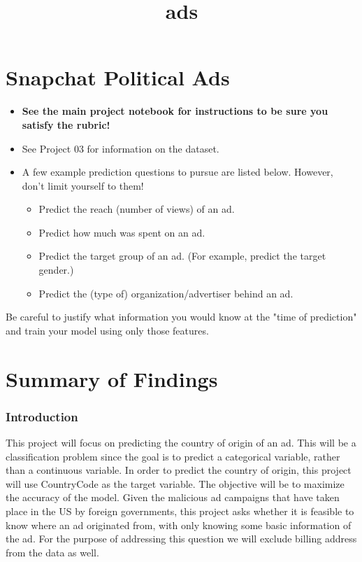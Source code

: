 \documentclass[11pt]{article}
\title{ads}
\providecommand{\tightlist}{%
      \setlength{\itemsep}{0pt}\setlength{\parskip}{0pt}}
\begin{document}
    
    
    \maketitle
    
    

    
    \section{Snapchat Political Ads}\label{snapchat-political-ads}

\begin{itemize}
\tightlist
\item
  \textbf{See the main project notebook for instructions to be sure you
  satisfy the rubric!}
\item
  See Project 03 for information on the dataset.
\item
  A few example prediction questions to pursue are listed below.
  However, don't limit yourself to them!

  \begin{itemize}
  \tightlist
  \item
    Predict the reach (number of views) of an ad.
  \item
    Predict how much was spent on an ad.
  \item
    Predict the target group of an ad. (For example, predict the target
    gender.)
  \item
    Predict the (type of) organization/advertiser behind an ad.
  \end{itemize}
\end{itemize}

Be careful to justify what information you would know at the "time of
prediction" and train your model using only those features.

    \section{Summary of Findings}\label{summary-of-findings}

\subsubsection{Introduction}\label{introduction}

This project will focus on predicting the country of origin of an ad.
This will be a classification problem since the goal is to predict a
categorical variable, rather than a continuous variable. In order to
predict the country of origin, this project will use CountryCode as the
target variable. The objective will be to maximize the accuracy of the
model. Given the malicious ad campaigns that have taken place in the US
by foreign governments, this project asks whether it is feasible to know
where an ad originated from, with only knowing some basic information of
the ad. For the purpose of addressing this question we will exclude
billing address from the data as well.
\end{document}
